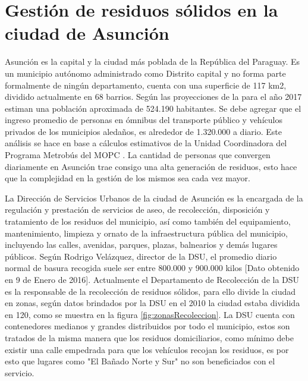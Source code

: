 \section{Gestión de residuos sólidos en la ciudad de Asunción}

Asunción es la capital y la ciudad más poblada de la República del Paraguay. Es un municipio autónomo administrado como Distrito capital y no forma parte formalmente de ningún departamento, cuenta con una superficie de 117 km2, dividido actualmente en 68 barrios. Según las proyecciones de la \citet*{DireccionGeneraldeEstadistica2015Paraguay2000-2025} para el año 2017 estiman una población aproximada de 524.190 habitantes. Se debe agregar que el ingreso promedio de  personas en ómnibus del transporte público y vehículos privados de los municipios aledaños, es alrededor de 1.320.000 a diario. Este análisis se hace en base a cálculos estimativos de la Unidad Coordinadora del Programa Metrobús del MOPC \citep{DiarioABCColor2016PorColor}. La cantidad de personas que convergen diariamente en Asunción trae consigo una alta generación de residuos, esto hace que la complejidad en la gestión de los mismos sea cada vez mayor.

La Dirección de Servicios Urbanos de la ciudad de Asunción es la encargada de la regulación y prestación de servicios de aseo, de recolección, disposición y tratamiento de los residuos del municipio, así como también del equipamiento, mantenimiento, limpieza y ornato de la infraestructura pública del municipio, incluyendo las calles, avenidas, parques, plazas, balnearios y demás lugares públicos. Según Rodrigo Velázquez, director de la DSU, el promedio diario normal de basura recogida suele ser entre 800.000 y 900.000 kilos \citep{LaNacion2016AsuncionBasura} [Dato obtenido en 9 de Enero de 2016]. 
Actualmente el Departamento de Recolección de la DSU es la responsable de la recolección de residuos sólidos, para ello divide la ciudad en zonas, según datos brindados por la DSU en el 2010 la ciudad estaba dividida en 120, como se muestra en la figura \ref{fig:zonasRecoleccion}. La DSU cuenta con contenedores medianos y grandes distribuidos por todo el municipio, estos son tratados de la misma manera que los residuos domiciliarios, como mínimo debe existir una calle empedrada para que los vehículos recojan los residuos, es por esto que lugares como "El Bañado Norte y Sur" no son beneficiados con el servicio.

